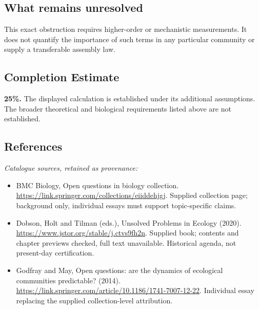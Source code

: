 \documentclass[11pt]{article}
\begin{document}
\subsection{What remains unresolved}
This exact obstruction requires higher-order or mechanistic measurements. It does not quantify the importance of such terms in any particular community or supply a transferable assembly law.
\subsection{Completion Estimate}
\textbf{25\%.} The displayed calculation is established under its additional assumptions. The broader theoretical and biological requirements listed above are not established.
\subsection{References}
\noindent\emph{Catalogue sources, retained as provenance:}
\begin{itemize}
\item BMC Biology, Open questions in biology collection. \url{https://link.springer.com/collections/eiiddehjgj}. Supplied collection page; background only, individual essays must support topic-specific claims.
\item Dobson, Holt and Tilman (eds.), Unsolved Problems in Ecology (2020). \url{https://www.jstor.org/stable/j.ctvs9fh2n}. Supplied book; contents and chapter previews checked, full text unavailable. Historical agenda, not present-day certification.
\item Godfray and May, Open questions: are the dynamics of ecological communities predictable? (2014). \url{https://link.springer.com/article/10.1186/1741-7007-12-22}. Individual essay replacing the supplied collection-level attribution.
\end{itemize}
\clearpage


\appendix
\end{document}
